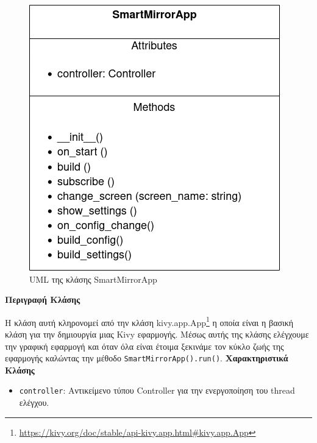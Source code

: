 \begin{figure}[h]
    \centering
    \includegraphics[scale=0.7]{images/chapter4/uml_diagrams/SmartMirrorApp.png}
    \caption{UML της κλάσης SmartMirrorApp}
    \label{fig:smartmirrorapp}
\end{figure}
\noindent\textbf{Περιγραφή Κλάσης}

Η κλάση αυτή κληρονομεί από την κλάση kivy.app.App\footnote{\href{https://kivy.org/doc/stable/api-kivy.app.html\#kivy.app.App}{https://kivy.org/doc/stable/api-kivy.app.html\#kivy.app.App}} η οποία είναι η βασική κλάση για την δημιουργία μιας Kivy εφαρμογής. Μέσως αυτής της κλάσης ελέγχουμε την γραφική εφαρμογή και όταν όλα είναι έτοιμα ξεκινάμε τον κύκλο ζωής της εφαρμογής καλώντας την μέθοδο \texttt{SmartMirrorApp().run()}.
\newpage
\noindent\textbf{Χαρακτηριστικά Κλάσης}
\begin{itemize}
    \item \texttt{controller}: Αντικείμενο τύπου Controller για την ενεργοποίηση του thread ελέγχου.
\end{itemize}

